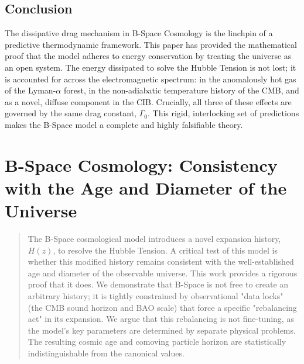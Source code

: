 \documentclass{BSpacePaper} %
\begin{document}
\begin{appendices}
\subsection{Conclusion}
The dissipative drag mechanism in B-Space Cosmology is the linchpin of a predictive thermodynamic framework. This paper has provided the mathematical proof that the model adheres to energy conservation by treating the universe as an open system. The energy dissipated to solve the Hubble Tension is not lost; it is accounted for across the electromagnetic spectrum: in the anomalously hot gas of the Lyman-$\alpha$ forest, in the non-adiabatic temperature history of the CMB, and as a novel, diffuse component in the CIB. Crucially, all three of these effects are governed by the same drag constant, $\Gamma_0$. This rigid, interlocking set of predictions makes the B-Space model a complete and highly falsifiable theory.

\clearpage

\section{B-Space Cosmology: Consistency with the Age and Diameter of the Universe}
\label{app:age}
\setcounter{equation}{0}
\setcounter{table}{0}
\setcounter{figure}{0}

\begin{abstract}
\noindent
The B-Space cosmological model introduces a novel expansion history, $H(z)$, to resolve the Hubble Tension. A critical test of this model is whether this modified history remains consistent with the well-established age and diameter of the observable universe. This work provides a rigorous proof that it does. We demonstrate that B-Space is not free to create an arbitrary history; it is tightly constrained by observational "data locks" (the CMB sound horizon and BAO scale) that force a specific "rebalancing act" in its expansion. We argue that this rebalancing is not fine-tuning, as the model's key parameters are determined by separate physical problems. The resulting cosmic age and comoving particle horizon are statistically indistinguishable from the canonical \lcdm{} values.
\end{abstract}


\end{appendices}
\end{document}

